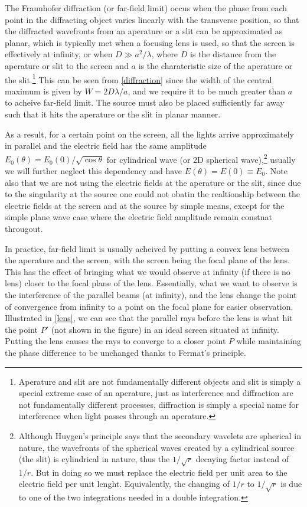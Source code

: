 \documentclass[english,a4paper,12pt]{report}
\begin{document}
The Fraunhofer diffraction (or far-field limit) occus when the phase from each point in the diffracting object varies linearly with the transverse position, so that the diffracted wavefronts from an aperature or a slit can be approximated as planar, which is typically met when a focusing lens is used, so that the screen is effectively at infinity, or when \(D \gg a^2/\lambda \), where \(D\) is the distance from the aperature or slit to the screen and \(a\) is the charateristic size of the aperature or the slit.\footnote{Aperature and slit are not fundamentally different objects and slit is simply a special extreme case of an aperature, just as interference and diffraction are not fundamentally different processes, diffraction is simply a special name for interference when light passes through an aperature.} This can be seen from \cref{diffraction} since the width of the central maximum is given by \(W = 2D\lambda /a\), and we require it to be much greater than \(a\) to acheive far-field limit. The source must also be placed sufficiently far away such that it hits the aperature or the slit in planar manner.

As a result, for a certain point on the screen, all the lights arrive approximately in parallel and the electric field has the same amplitude \(E_0 (\theta ) = E_0 (0) / \sqrt{\cos \theta } \) for cylindrical wave (or 2D spherical wave),\footnote{Although Huygen's principle says that the secondary wavelets are spherical in nature, the wavefronts of the spherical waves created by a cylindrical source (the slit) is cylindrical in nature, thus the \(1 /\sqrt{r} \) decaying factor instead of \(1/r\). But in doing so we must replace the electric field per unit area to the electric field per unit lenght. Equivalently, the changing of \(1/r\) to \(1/\sqrt{r} \) is due to one of the two integrations needed in a double integration.} usually we will further neglect this dependency and have \(E(\theta ) = E(0) \equiv  E_0 \). Note also that we are not using the electric fields at the aperature or the slit, since due to the singularity at the source one could not obatin the realtionship between the electric fields at the screen and at the source by simple means, except for the simple plane wave case where the electric field amplitude remain constnat througout.

In practice, far-field limit is usually acheived by putting a convex lens between the aperature and the screen, with the screen being the focal plane of the lens. This has the effect of bringing what we would observe at infinity (if there is no lens) closer to the focal plane of the lens. Essentially, what we want to observe is the interference of the parallel beams (at infinity), and the lens change the point of convergence from infinity to a point on the focal plane for easier observation. Illustrated in \cref{lens}, we can see that the parallel rays before the lens is what hit the point \(P'\) (not shown in the figure) in an ideal screen situated at infinity. Putting the lens causes the rays to converge to a closer point \(P\) while maintaining the phase difference to be unchanged thanks to Fermat's principle.
\end{document}
